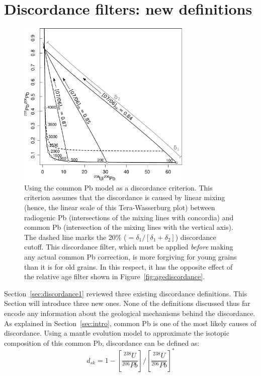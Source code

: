 \documentclass[gchron, manuscript]{copernicus}
\begin{document}
\section{Discordance filters: new definitions}\label{sec:discordance2}

\begin{figure}[t]
  \includegraphics[width=8.3cm]{TW-sk.pdf}
    \caption{Using the \citet{stacey1975} common Pb model as a
      discordance criterion. This criterion assumes that the
      discordance is caused by linear mixing (hence, the linear scale
      of this Tera-Wasserburg plot) between radiogenic Pb
      (intersections of the mixing lines with concordia) and common Pb
      (intersection of the mixing lines with the vertical axis). The
      dashed line marks the 20\% ($= \delta_1/[\delta_1+\delta_2]$)
      discordance cutoff. This discordance filter, which must be
      applied \emph{before} making any actual common Pb correction, is
      more forgiving for young grains than it is for old grains. In
      this respect, it has the opposite effect of the relative age
      filter shown in Figure~\ref{fig:agediscordance}.  }
    \label{fig:SK}
\end{figure}

Section~\ref{sec:discordance1} reviewed three existing discordance
definitions.  This Section will introduce three new ones.  None of the
definitions discussed thus far encode any information about the
geological mechanisms behind the discordance. As explained in
Section~\ref{sec:intro}, common Pb is one of the most likely causes of
discordance. Using a mantle evolution model \citep[e.g.][]{stacey1975}
to approximate the isotopic composition of this common Pb, discordance
can be defined as:
\begin{equation}
  d_{sk} = 1 - \left[\frac{{}^{238}U}{{}^{206}Pb}\right]\bigg/\left[\frac{{}^{238}U}{{}^{206}Pb}\right]^\ast
  \label{eq:dsk}
\end{equation}
\end{document}

